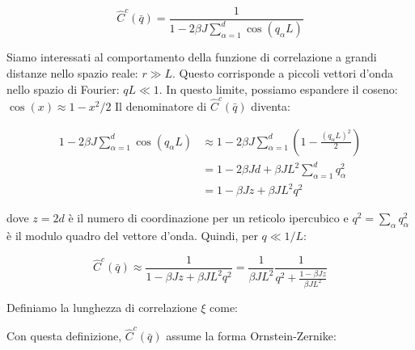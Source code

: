 \begin{equation} \label{eq:ch19_21}
\hat{C}^c(\bar{q}) = \frac{1}{1 - 2\beta J \sum_{\alpha=1}^{d} \cos(q_{\alpha}L)}
\end{equation}

Siamo interessati al comportamento della funzione di correlazione a grandi distanze nello spazio reale: $r \gg L$. Questo corrisponde a piccoli vettori d'onda nello spazio di Fourier: $qL \ll 1$.
In questo limite, possiamo espandere il coseno: $\cos(x) \approx 1 - x^2/2$
Il denominatore di $\hat{C}^c(\bar{q})$ diventa:

\begin{align*}
1 - 2\beta J \sum_{\alpha=1}^{d} \cos(q_{\alpha}L) &\approx 1 - 2\beta J \sum_{\alpha=1}^{d} \left(1 - \frac{(q_{\alpha}L)^2}{2}\right) \\
&= 1 - 2\beta J d + \beta J L^2 \sum_{\alpha=1}^{d} q_{\alpha}^2 \\
&= 1 - \beta J z + \beta J L^2 q^2
\end{align*}

dove $z = 2d$ è il numero di coordinazione per un reticolo ipercubico e $q^2 = \sum_{\alpha} q_{\alpha}^2$ è il modulo quadro del vettore d'onda.
Quindi, per $q \ll 1/L$:

\begin{equation} \label{eq:ch19_22}
\hat{C}^c(\bar{q}) \approx \frac{1}{1 - \beta J z + \beta J L^2 q^2} = \frac{1}{\beta J L^2} \frac{1}{q^2 + \frac{1-\beta J z}{\beta J L^2}}
\end{equation}

Definiamo la lunghezza di correlazione $\xi$ come:

\vspace{0.5cm}
\noindent{}
\vspace{0.5cm}

Con questa definizione, $\hat{C}^c(\bar{q})$ assume la forma Ornstein-Zernike:

\vspace{0.5cm}
\noindent{}
\vspace{0.5cm}

